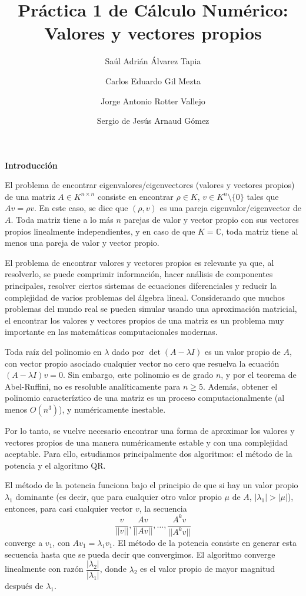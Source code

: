 \documentclass[11pt]{article}
\begin{document}
\author{Saúl Adrián Álvarez Tapia \and Carlos Eduardo Gil Mezta \and Jorge Antonio Rotter Vallejo \and Sergio de Jesús Arnaud Gómez}

\title{\Huge Práctica 1 de Cálculo Numérico: Valores y vectores propios}
\date{}
\maketitle

\noindent
\textbf{\LARGE{Introducción}}

\noindent
El problema de encontrar eigenvalores/eigenvectores (valores y vectores propios) de una matriz $A\in K^{n\times n}$ consiste en encontrar $\rho \in K$, $v\in K^n\setminus\{0\}$ tales que $Av=\rho v$. En este caso, se dice que $(\rho,v)$ es una pareja eigenvalor/eigenvector de $A$. Toda matriz tiene a lo más $n$ parejas de valor y vector propio con sus vectores propios linealmente independientes, y en caso de que $K=\mathbb{C}$, toda matriz tiene al menos una pareja de valor y vector propio.

El problema de encontrar valores y vectores propios es relevante ya que, al resolverlo, se puede comprimir información, hacer análisis de componentes principales, resolver ciertos sistemas de ecuaciones diferenciales y reducir la complejidad de varios problemas del álgebra lineal. Considerando que muchos problemas del mundo real se pueden simular usando una aproximación matricial, el encontrar los valores y vectores propios de una matriz es un problema muy importante en las matemáticas computacionales modernas.

Toda raíz del polinomio en $\lambda$ dado por $\det(A-\lambda I)$ es un valor propio de $A$, con vector propio asociado cualquier vector no cero que resuelva la ecuación $(A-\lambda I)v=0$. Sin embargo, este polinomio es de grado $n$, y por el teorema de Abel-Ruffini, no es resoluble analíticamente para $n\geq 5$. Además, obtener el polinomio caracteríztico de una matriz es un proceso computacionalmente (al menos $O(n^3)$), y numéricamente inestable.

Por lo tanto, se vuelve necesario encontrar una forma de aproximar los valores y vectores propios de una manera numéricamente estable y con una complejidad aceptable. Para ello, estudiamos principalmente dos algoritmos: el método de la potencia y el algoritmo QR.

El método de la potencia funciona bajo el principio de que si hay un valor propio $\lambda_1$ dominante (es decir, que para cualquier otro valor propio $\mu$ de $A$, $|\lambda_1|>|\mu|$), entonces, para casi cualquier vector $v$, la secuencia $$\dfrac{v}{||v||},\dfrac{Av}{||Av||},\dots,\dfrac{A^kv}{||A^kv||}$$ converge a $v_1$, con $Av_1=\lambda_1v_1$. El método de la potencia consiste en generar esta secuencia hasta que se pueda decir que convergimos. El algoritmo converge linealmente con razón $\dfrac{|\lambda_2|}{|\lambda_1|}$, donde $\lambda_2$ es el valor propio de mayor magnitud después de $\lambda_1$.
\end{document}
